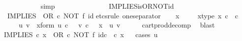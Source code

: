 \begin{isabellebody}
\ \ \ \ \ \ \ \ \ \ \isamarkupfalse%
\ simp\isanewline
\ \ \ \ \ \ \isamarkupfalse%
\isanewline
\ \ \ \ \isamarkupfalse%
\isanewline
\ \ \isamarkupfalse%
\isanewline
{}\isamarkupfalse%
%
\endisatagproof
{\isafoldproof}%
%
\isadelimproof
\isanewline
%
\endisadelimproof
\isanewline
{}\isamarkupfalse%
\ IMPLIES{\isacharunderscore}{\kern0pt}is{\isacharunderscore}{\kern0pt}OR{\isacharunderscore}{\kern0pt}NOT{\isacharunderscore}{\kern0pt}id{\isacharcolon}{\kern0pt}\isanewline
\ \ {\isachardoublequoteopen}IMPLIES\ {\isacharequal}{\kern0pt}\ OR\ {\isasymcirc}\isactrlsub c\ {\isacharparenleft}{\kern0pt}NOT\ {\isasymtimes}\isactrlsub f\ id{\isacharparenleft}{\kern0pt}{\isasymOmega}{\isacharparenright}{\kern0pt}{\isacharparenright}{\kern0pt}{\isachardoublequoteclose}\isanewline
%
\isadelimproof
%
\endisadelimproof
%
\isatagproof
{}\isamarkupfalse%
{\isacharparenleft}{\kern0pt}etcs{\isacharunderscore}{\kern0pt}rule\ one{\isacharunderscore}{\kern0pt}separator{\isacharparenright}{\kern0pt}\isanewline
\ \ \isamarkupfalse%
\ x\ \isanewline
\ \ \isamarkupfalse%
\ x{\isacharunderscore}{\kern0pt}type{\isacharcolon}{\kern0pt}\ {\isachardoublequoteopen}x\ {\isasymin}\isactrlsub c\ {\isasymOmega}\ {\isasymtimes}\isactrlsub c\ {\isasymOmega}{\isachardoublequoteclose}\isanewline
\ \ \isamarkupfalse%
\ \isamarkupfalse%
\ u\ v\ \ x{\isacharunderscore}{\kern0pt}form{\isacharcolon}{\kern0pt}\ {\isachardoublequoteopen}u\ {\isasymin}\isactrlsub c\ {\isasymOmega}\ {\isasymand}\ v\ {\isasymin}\isactrlsub c\ {\isasymOmega}\ {\isasymand}\ x\ {\isacharequal}{\kern0pt}\ {\isasymlangle}u{\isacharcomma}{\kern0pt}\ v{\isasymrangle}{\isachardoublequoteclose}\isanewline
\ \ \ \ \isamarkupfalse%
\ cart{\isacharunderscore}{\kern0pt}prod{\isacharunderscore}{\kern0pt}decomp\ \isamarkupfalse%
\ blast\isanewline
\ \ \isamarkupfalse%
\ {\isachardoublequoteopen}IMPLIES\ {\isasymcirc}\isactrlsub c\ x\ {\isacharequal}{\kern0pt}\ {\isacharparenleft}{\kern0pt}OR\ {\isasymcirc}\isactrlsub c\ NOT\ {\isasymtimes}\isactrlsub f\ id\isactrlsub c\ {\isasymOmega}{\isacharparenright}{\kern0pt}\ {\isasymcirc}\isactrlsub c\ x{\isachardoublequoteclose}\isanewline
\ \ \isamarkupfalse%
{\isacharparenleft}{\kern0pt}cases\ {\isachardoublequoteopen}u\ {\isacharequal}{\kern0pt}\ {\isasymt}{\isachardoublequoteclose}{\isacharparenright}{\kern0pt}\isanewline
\ \ \ \ \isamarkupfalse%

\end{isabellebody}
